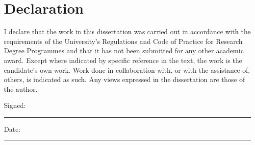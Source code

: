\chapter*{Declaration}

I declare that the work in this dissertation was carried out in accordance with the 
requirements of the University's Regulations and Code of Practice for Research Degree Programmes 
and that it has not been submitted for any other academic award. 
Except where indicated by specific reference in the text, the work is the candidate's own work. 
Work done in collaboration with, or with the assistance of, others, is indicated as such. 
Any views expressed in the dissertation are those of the author.


\vspace{1.5cm}
Signed: 
\begin{center}
    \rule{12cm}{0.25mm}
\end{center}

\vspace{1.5cm}
Date: 
\begin{center}
    \rule{12cm}{0.25mm}
\end{center}


